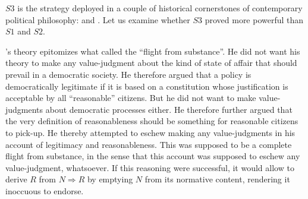 \documentclass[preprint, french, english, 11pt, authoryear]{elsarticle}%
\begin{document}

$S3$ is the strategy deployed in a couple of historical cornerstones of contemporary political philosophy: \cite{rawls_political_2005} and \cite{habermas_moralbewustsein_1983}. Let us examine whether $S3$ proved more powerful than $S1$ and $S2$.

\cite{rawls_political_2005}'s theory epitomizes what \cite{estlund_democratic_2009} called the ``flight from substance''. He did not want his theory to make any value-judgment about the kind of state of affair that should prevail in a democratic society. He therefore argued that a policy is democratically legitimate if it is based on a constitution whose justification is acceptable by all  ``reasonable'' citizens. But he did not want to make value-judgments about democratic processes either. He therefore further argued that the very definition of reasonableness should be something for reasonable citizens to pick-up. He thereby attempted to eschew making any value-judgments in his account of legitimacy and reasonableness. This was supposed to be a complete flight from substance, in the sense that this account was supposed to eschew any value-judgment, whatsoever. If this reasoning were successful, it would allow to derive $R$ from $N ⇒ R$ by emptying $N$ from its normative content, rendering it inoccuous to endorse.
\end{document}
